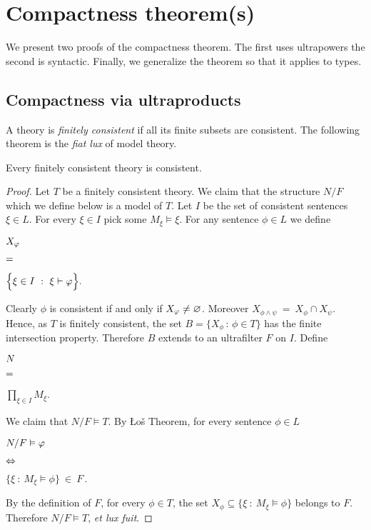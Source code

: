 \chapter{Compactness theorem(s)}
\label{compactness}

\def\medrel#1{\parbox[t]{6ex}{$\displaystyle\hfil #1$}}
\def\ceq#1#2#3{\parbox{20ex}{$\displaystyle #1$}\medrel{#2}$\displaystyle  #3$}

We present two proofs of the compactness theorem.
The first uses ultrapowers the second is syntactic.
Finally, we generalize the theorem so that it applies to types.

\section{Compactness via ultraproducts}\label{compactness_Ultra}
\def\medrel#1{\parbox[t]{6ex}{$\displaystyle\hfil #1$}}
\def\ceq#1#2#3{\parbox{25ex}{$\displaystyle #1$}\medrel{#2}$\displaystyle  #3$}

A theory is \emph{finitely consistent\/} if all its finite subsets are consistent.
The following theorem is the \textit{fiat lux\/} of model theory. 

\begin{void}\label{thmcompattezza}
Every finitely consistent theory is consistent. 
\end{void}

\begin{proof}
Let  $T$ be a finitely consistent theory. 
We claim that the structure $N/F$ which we define below is a model of $T$. Let $I$ be the set of consistent sentences $\xi\in L$.
For every $\xi\in I$ pick some $M_\xi\models\xi$.
For any sentence $\phi\in L$ we define

\ceq{\hfill X_\phi}{=}{\Big\{\xi\in I\ :\ \xi\proves \phi\Big\}.}

Clearly $\phi$ is consistent if and only if $X_\varphi\neq\varnothing$.
Moreover $X_{\phi\wedge\psi}\ =\ X_\phi\cap X_\psi$.
Hence, as $T$ is finitely consistent, the set $B=\big\{X_\phi\,:\,\phi\in T\big\}$ has the finite intersection property. Therefore $B$ extends to an ultrafilter $F$ on $I$. Define

\ceq{\hfill N}{=}{\prod_{\xi\in I}M_\xi}.

We claim that $N/F\models T$. By \L o\v{s} Theorem, for every sentence $\phi\in L$

\ceq{\hfill N/F\models \phi}%
{\IFF}%
{\Big\{\xi\ :\ M_\xi\models\phi\Big\}\ \in\ F\,.}

By the definition of $F$, for every $\phi\in T$, the set $X_\phi\subseteq \big\{\xi\ :\ M_\xi\models \phi\big\}$ belongs to $F$. Therefore $N/F\models T$, \textit{et lux fuit}.
\end{proof}

